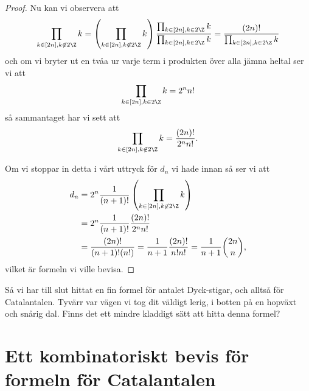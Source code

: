 \documentclass[nobib]{tufte-handout}
\begin{document}
\begin{theorem}
\begin{proof}
        Nu kan vi observera att
        $$\prod_{k \in [2n], k \not\in2\Z} k = \left(\prod_{k \in [2n], k \not\in2\Z} k\right)\frac{\prod_{k \in [2n], k \in2\Z} k}{\prod_{k \in [2n], k \in2\Z} k} = \frac{(2n)!}{\prod_{k \in [2n], k \in2\Z} k}$$
        och om vi bryter ut en tvåa ur varje term i produkten över alla jämna heltal ser vi att
        $$\prod_{k \in [2n], k \in2\Z} k = 2^n n!$$
        så sammantaget har vi sett att
        $$\prod_{k \in [2n], k \not\in2\Z} k = \frac{(2n)!}{2^n n!}.$$

        Om vi stoppar in detta i vårt uttryck för $d_n$ vi hade innan så ser vi att
        \begin{align*}
            d_n &= 2^n \frac{1}{(n+1)!}\left(\prod_{k \in [2n], k \not\in2\Z} k\right)\\
            &= 2^n \frac{1}{(n+1)!}\frac{(2n)!}{2^n n!}\\
            &= \frac{(2n)!}{(n+1)!(n!)} = \frac{1}{n+1} \frac{(2n)!}{n!n!} = \frac{1}{n+1}\binom{2n}{n},
        \end{align*}
        vilket är formeln vi ville bevisa.
    \end{proof}
\end{theorem}

Så vi har till slut hittat en fin formel för antalet Dyck-stigar, och alltså för Catalantalen. Tyvärr var vägen vi tog dit väldigt lerig, i botten på en hopväxt och snårig dal. Finns det ett mindre kladdigt sätt att hitta denna formel?

\section{Ett kombinatoriskt bevis för formeln för Catalantalen}
\end{document}
